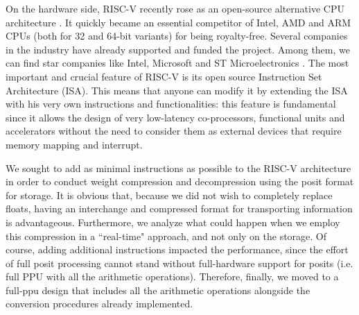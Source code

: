 On the hardware side, RISC-V recently rose as an open-source alternative CPU architecture \cite{riscvisa,waterman2011risc,asanovic2014instruction}. It quickly became an essential competitor of Intel, AMD and ARM CPUs (both for 32 and 64-bit variants) for being royalty-free. Several companies in the industry have already supported and funded the project. Among them, we can find star companies like Intel, Microsoft and ST Microelectronics \cite{riscvabout}. The most important and crucial feature of RISC-V is its open source Instruction Set Architecture (ISA).
This means that anyone can modify it by extending the ISA with his very own instructions and functionalities: this feature is fundamental since it allows the design of very low-latency co-processors, functional units and accelerators without the need to consider them as external devices that require memory mapping and interrupt.

We sought to add as minimal instructions as possible to the RISC-V architecture in order to conduct weight compression and decompression using the posit format for storage. It is obvious that, because we did not wish to completely replace floats, having an interchange and compressed format for transporting information is advantageous. Furthermore, we analyze what could happen when we employ this compression in a ``real-time" approach, and not only on the storage. Of course, adding additional instructions impacted the performance, since the effort of full posit processing cannot stand without full-hardware support for posits (i.e. full PPU with all the arithmetic operations). Therefore, finally, we moved to a full-ppu design that includes all the arithmetic operations alongside the conversion procedures already implemented.

